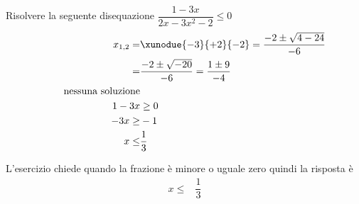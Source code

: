 	Risolvere la seguente disequazione $\dfrac{1-3x}{2x-3x^2-2}\leq 0$
	\begin{align*}
	x_{1,2}=&\xunodue{-3}{+2}{-2}=\dfrac{-2\pm\sqrt{4-24}}{-6}\\
	=&\dfrac{-2\pm\sqrt{-20}}{-6}=\dfrac{1\pm 9}{-4}\\
\qquad\text{nessuna soluzione}\\
		1-3x&\geq0\\
	-3x\geq&-1\\
	x\leq&\dfrac{1}{3}\\
	\end{align*}
	\begin{center}
		
	\end{center}
	L'esercizio chiede quando la frazione è minore o uguale zero quindi la risposta è
	\begin{align*}
	 x\leq&\dfrac{1}{3}\\
	\end{align*}
